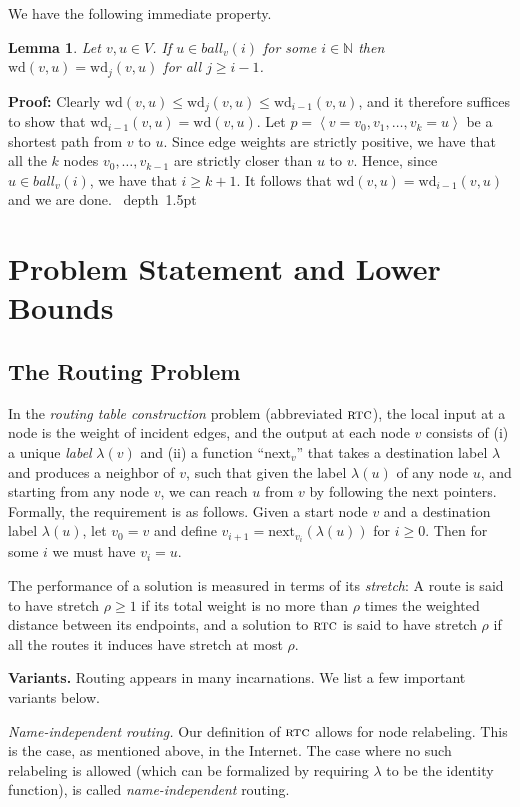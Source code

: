 \documentclass[letterpaper,11pt]{article}
\newtheorem{lemma}[theorem]{Lemma}
\newcommand{\blackslug}{\hbox{\hskip 1pt \vrule width 4pt height 8pt
depth 1.5pt \hskip 1pt}}
\newcommand{\QED}{\quad\blackslug\lower 8.5pt\null\par}
\newenvironment{proof}[1][Proof:]{\noindent \textbf{#1}\xspace}{\QED}
\newcommand{\N}{\mathbb{N}}
\newcommand{\Seq}[1]{\left\langle #1 \right\rangle}
\newcommand{\Next}{\mathrm{next}}
\newcommand{\Wd}{\mathrm{wd}}
\newcommand{\Ball}{\mathit{ball}}
\newcommand{\rtc}{\textsc{rtc}}
\begin{document}
We have the following immediate property.
\begin{lemma}
\label{lem:h}
Let $v,u\in V$. If $u\in\Ball_v(i)$ for some $i\in\N$
then $\Wd(v,u)=\Wd_j(v,u)$ for all
$j\ge i-1$.
\end{lemma}
\begin{proof}
Clearly $\Wd(v,u)\le\Wd_j(v,u)\le\Wd_{i-1}(v,u)$, and it therefore suffices to
show that $\Wd_{i-1}(v,u)=\Wd(v,u)$. Let $p=\Seq{v=v_0,v_1,\ldots,v_k=u}$ be a
shortest path from $v$ to $u$. Since edge weights are strictly positive, we have
that all the $k$ nodes $v_0,\ldots,v_{k-1}$ are strictly closer than $u$ to $v$.
Hence, since $u\in\Ball_v(i)$, we have that $i\ge k+1$. It follows that
$\Wd(v,u)=\Wd_{i-1}(v,u)$ and we are done.
\end{proof}




\section{Problem Statement and Lower Bounds}
\label{sec:prel}
\subsection{The Routing Problem}
\label{sec:problem}
In the \emph{routing table construction} problem (abbreviated $\rtc$), the local
input at a node is the weight of incident edges, and the output at each node $v$
consists of (i) a unique \emph{label} $\lambda(v)$ and (ii) a function
``$\Next_v$'' that takes a destination label $\lambda$ and produces a neighbor
of $v$, such that given the label $\lambda(u)$ of any node $u$, and starting
from any node $v$, we can reach $u$ from $v$ by following the $\Next$ pointers.
Formally, the requirement is as follows. Given a start node $v$ and a
destination label $\lambda(u)$, let $v_0=v$ and define
$v_{i+1}=\Next_{v_i}(\lambda(u))$ for $i\ge 0$. Then for some $i$ we must have
$v_i=u$.

The performance of a solution is measured in terms of its \emph{stretch}: A
route is said to have stretch $\rho\ge1$ if its total weight is no more than
$\rho$ times the weighted distance between its endpoints, and a solution to
$\rtc$ is said to have stretch $\rho$ if all the routes it induces have stretch
at most $\rho$.

\noindent\textbf{Variants.} Routing appears in many incarnations. We list a few
important variants below.

\emph{Name-independent routing.} Our definition of $\rtc$
allows for node relabeling. This is the case, as
mentioned above, in the Internet. The case where no such relabeling is allowed
(which can be formalized by requiring $\lambda$ to be the
identity function), is called \emph{name-independent} routing.
\end{document}
